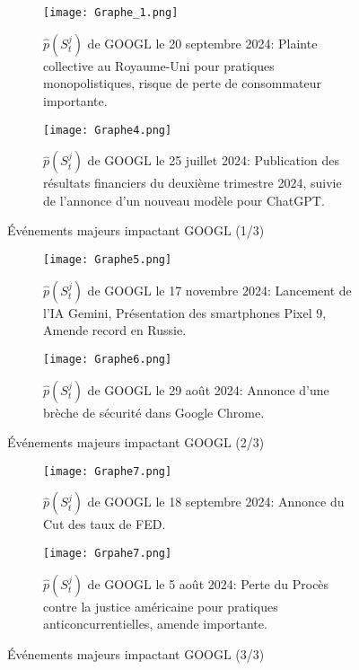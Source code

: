 \documentclass[12pt,a4paper]{article}
\theoremstyle{definition}
\theoremstyle{remark}
\begin{document}
\clearpage
\\
\\
\begin{figure}[h!]
    \centering
    \begin{subfigure}[b]{0.40\textwidth}
        \centering
        \texttt{[image: Graphe\_1.png]}
        \caption{$\hat{p}(S_t^j)$ de GOOGL le 20 septembre 2024: Plainte collective au Royaume-Uni pour pratiques monopolistiques, risque de perte de consommateur importante.}
        \label{fig:trades1}
    \end{subfigure}
    \hfill
    \begin{subfigure}[b]{0.40\textwidth}
        \centering
        \texttt{[image: Graphe4.png]}
        \caption{$\hat{p}(S_t^j)$ de GOOGL le 25 juillet 2024: Publication des résultats financiers du deuxième trimestre 2024, suivie de l'annonce d'un nouveau modèle pour ChatGPT.}
        \label{fig:trades2}
    \end{subfigure}
    \caption{Événements majeurs impactant GOOGL (1/3)}
    \label{fig:comparison1}
\end{figure}

\begin{figure}[h!]
    \centering
    \begin{subfigure}[b]{0.40\textwidth}
        \centering
        \texttt{[image: Graphe5.png]}
        \caption{$\hat{p}(S_t^j)$ de GOOGL le 17 novembre 2024: Lancement de l'IA Gemini, Présentation des smartphones Pixel 9, Amende record en Russie.}
        \label{fig:trades3}
    \end{subfigure}
    \hfill
    \begin{subfigure}[b]{0.40\textwidth}
        \centering
        \texttt{[image: Graphe6.png]}
        \caption{$\hat{p}(S_t^j)$ de GOOGL le 29 août 2024: Annonce d'une brèche de sécurité dans Google Chrome.}
        \label{fig:trades4}
    \end{subfigure}
    \caption{Événements majeurs impactant GOOGL (2/3)}
    \label{fig:comparison2}
\end{figure}


\begin{figure}[b!]
    \centering
    \begin{subfigure}[b]{0.40\textwidth}
        \centering
        \texttt{[image: Graphe7.png]}
        \caption{$\hat{p}(S_t^j)$ de GOOGL le 18 septembre 2024: Annonce du Cut des taux de FED.}
        \label{fig:trades5}
    \end{subfigure}
    \hfill
    \begin{subfigure}[b]{0.40\textwidth}
        \centering
        \texttt{[image: Grpahe7.png]}
        \caption{$\hat{p}(S_t^j)$ de GOOGL le 5 août 2024: Perte du Procès contre la justice américaine pour pratiques anticoncurrentielles, amende importante.}
        \label{fig:trades6}
    \end{subfigure}
    \caption{Événements majeurs impactant GOOGL (3/3)}
    \label{fig:comparison3}
\end{figure}
\end{document}
